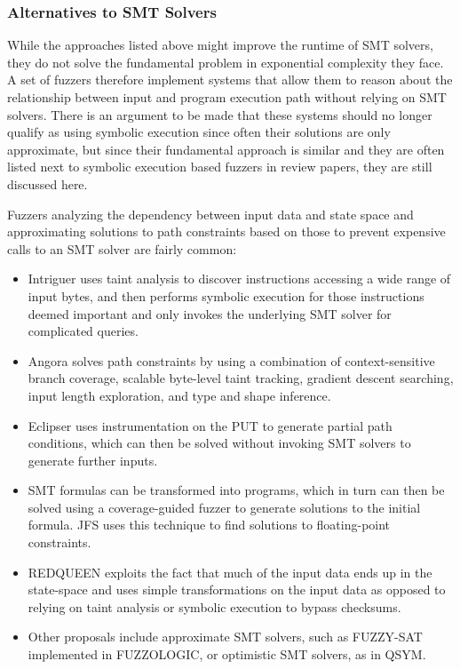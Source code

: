 \documentclass{article}
\begin{document}
\begin{multicols}{2}
    \subsubsection{Alternatives to SMT Solvers}
    While the approaches listed above might improve the runtime of SMT solvers, they do not solve the fundamental problem in exponential complexity they face. A set of fuzzers therefore implement systems that allow them to reason about the relationship between input and program execution path without relying on SMT solvers. There is an argument to be made that these systems should no longer qualify as using symbolic execution since often their solutions are only approximate, but since their fundamental approach is similar and they are often listed next to symbolic execution based fuzzers in review papers, they are still discussed here.

    Fuzzers analyzing the dependency between input data and state space and approximating solutions to path constraints based on those to prevent expensive calls to an SMT solver are fairly common\cite{WEIZZ}:

    \begin{itemize}
        \item Intriguer\cite{Intriguer} uses taint analysis to discover instructions accessing a wide range of input bytes, and then performs symbolic execution for those instructions deemed important and only invokes the underlying SMT solver for complicated queries.
        \item Angora\cite{Angora} solves path constraints by using a combination of context-sensitive branch coverage, scalable byte-level taint tracking, gradient descent searching, input length exploration, and type and shape inference.
        \item Eclipser\cite{Eclipser} uses instrumentation on the PUT to generate partial path conditions, which can then be solved without invoking SMT solvers to generate further inputs.
        \item SMT formulas can be transformed into programs, which in turn can then be solved using a coverage-guided fuzzer to generate solutions to the initial formula. JFS\cite{JFS} uses this technique to find solutions to floating-point constraints.
        \item REDQUEEN\cite{REDQUEEN} exploits the fact that much of the input data ends up in the state-space and uses simple transformations on the input data as opposed to relying on taint analysis or symbolic execution to bypass checksums.
        \item Other proposals include approximate SMT solvers, such as FUZZY-SAT implemented in FUZZOLOGIC\cite{FUZZOLIC}, or optimistic SMT solvers, as in QSYM\cite{QSYM}.
    \end{itemize}


\end{multicols}
\end{document}
